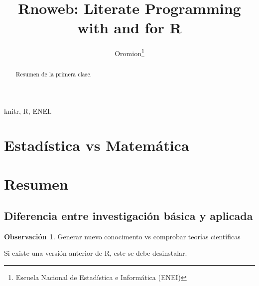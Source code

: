 \documentclass[10pt,a4paper]{IEEEtran}\usepackage[]{graphicx}\usepackage[]{color}
\title{Rnoweb: Literate Programming with and for R}
\author{Oromion\thanks{Escuela Nacional de Estadística e Informática (ENEI)}}
\theoremstyle{definition}
\newtheorem{remark}{Observación}
\begin{document}
\maketitle

\begin{abstract}
Resumen de la primera clase.
\end{abstract}

\begin{IEEEkeywords}
knitr, R, ENEI.
\end{IEEEkeywords}

\section{Estadística vs Matemática}

\section{Resumen}
\subsection{Diferencia entre investigación básica y aplicada}

\begin{remark}
Generar nuevo conocimento vs comprobar teorías científicas
\end{remark}

Si existe una versión anterior de R, este se debe desinstalar.
\end{document}
